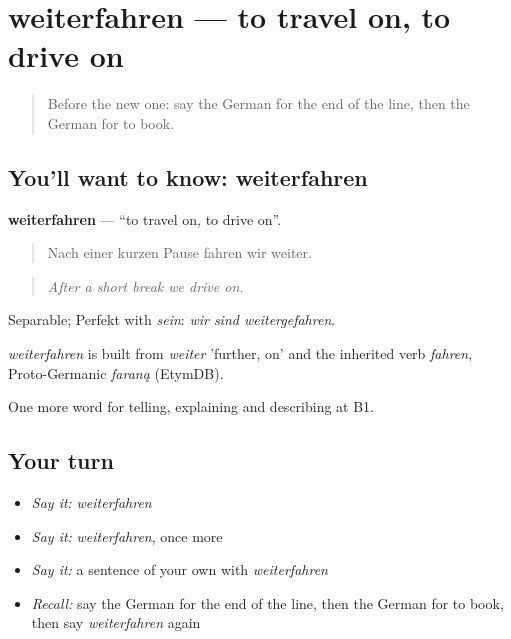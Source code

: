 \section[weiterfahren]{weiterfahren — to travel on, to drive on}

\label{lesson:GE-C413-weiterfahren}



\begin{quote}
Before the new one: say the German for the end of the line, then the German for to book.
\end{quote}

\subsection*{You'll want to know: weiterfahren}
\textbf{weiterfahren} — \textquotedblleft{}to travel on, to drive on\textquotedblright{}.

\begin{quote}
Nach einer kurzen Pause fahren wir weiter.
\end{quote}

\begin{quote}
\emph{After a short break we drive on.}
\end{quote}

Separable; Perfekt with \emph{sein}: \emph{wir sind weitergefahren}.

\begin{cousinweb}
\emph{weiterfahren} is built from \emph{weiter} 'further, on' and the inherited verb \emph{fahren}, Proto-Germanic \emph{faraną} (EtymDB).
\end{cousinweb}

\begin{grammarlens}[title={What you've built}]
One more word for telling, explaining and describing at B1.
\end{grammarlens}

\subsection*{Your turn}
\begin{itemize}
\raggedright
  \item \emph{Say it:} \emph{weiterfahren}
  \item \emph{Say it:} \emph{weiterfahren}, once more
  \item \emph{Say it:} a sentence of your own with \emph{weiterfahren}
  \item \emph{Recall:} say the German for the end of the line, then the German for to book, then say \emph{weiterfahren} again
\end{itemize}

